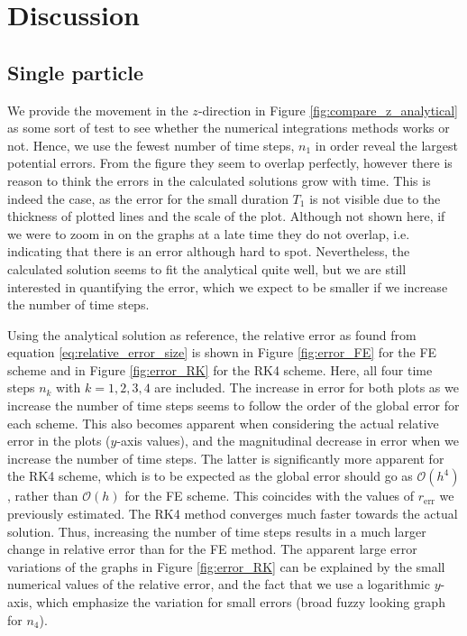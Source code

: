 \section{Discussion}\label{sec:discussion}

\subsection{Single particle}

We provide the movement in the $z$-direction in Figure \ref{fig:compare_z_analytical} as some sort of test to see whether the numerical integrations methods works or not. Hence, we use the fewest number of time steps, $n_1$ in order reveal the largest potential errors. From the figure they seem to overlap perfectly, however there is reason to think the errors in the calculated solutions grow with time. This is indeed the case, as the error for the small duration $T_1$ is not visible due to the thickness of plotted lines and the scale of the plot. Although not shown here, if we were to zoom in on the graphs at a late time they do not overlap, i.e. indicating that there is an error although hard to spot. Nevertheless, the calculated solution seems to fit the analytical quite well, but we are still interested in quantifying the error, which we expect to be smaller if we increase the number of time steps. 

Using the analytical solution as reference, the relative error as found from equation \eqref{eq:relative_error_size} is shown in Figure \ref{fig:error_FE} for the FE scheme and in Figure \ref{fig:error_RK} for the RK4 scheme. Here, all four time steps $n_k$ with $k=1,2,3,4$ are included. The increase in error for both plots as we increase the number of time steps seems to follow the order of the global error for each scheme. This also becomes apparent when considering the actual relative error in the plots ($y$-axis values), and the magnitudinal decrease in error when we increase the number of time steps. The latter is significantly more apparent for the RK4 scheme, which is to be expected as the global error should go as $\mathcal{O}(h^4)$, rather than $\mathcal{O}(h)$ for the FE scheme. This coincides with the values of $r_\mathrm{err}$ we previously estimated. The RK4 method converges much faster towards the actual solution. Thus, increasing the number of time steps results in a much larger change in relative error than for the FE method. The apparent large error variations of the graphs in Figure \ref{fig:error_RK} can be explained by the small numerical values of the relative error, and the fact that we use a logarithmic $y$-axis, which emphasize the variation for small errors (broad fuzzy looking graph for $n_4$). 


